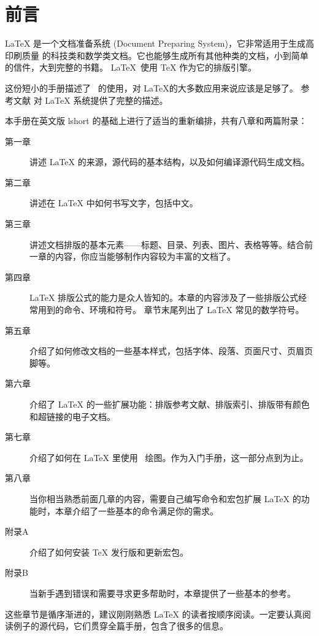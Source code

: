 \chapter{前言}

\LaTeX{} \cite{manual} 是一个文档准备系统 (Document Preparing System)，它非常适用于生成高印刷质量
的科技类和数学类文档。它也能够生成所有其他种类的文档，小到简单的信件，大到完整的书籍。
\LaTeX~使用 \TeX{} \cite{texbook} 作为它的排版引擎。

这份短小的手册描述了 \LaTeXe\ 的使用，对 \LaTeX 的大多数应用来说应该是足够了。
参考文献 \cite{manual,companion} 对 \LaTeX{} 系统提供了完整的描述。

\bigskip
本手册在英文版 lshort 的基础上进行了适当的重新编排，共有八章和两篇附录：
\begin{description}
  \item[第一章] 讲述 \LaTeX{} 的来源，源代码的基本结构，以及如何编译源代码生成文档。
  \item[第二章] 讲述在 \LaTeX{} 中如何书写文字，包括中文。
  \item[第三章] 讲述文档排版的基本元素——标题、目录、列表、图片、表格等等。结合前一章的内容，你应当能够制作内容较为丰富的文档了。
  \item[第四章] \LaTeX{} 排版公式的能力是众人皆知的。本章的内容涉及了一些排版公式经常用到的命令、环境和符号。
                章节末尾列出了 \LaTeX{} 常见的数学符号。
  \item[第五章] 介绍了如何修改文档的一些基本样式，包括字体、段落、页面尺寸、页眉页脚等。
  \item[第六章] 介绍了 \LaTeX{} 的一些扩展功能：排版参考文献、排版索引、排版带有颜色和超链接的电子文档。
  \item[第七章] 介绍了如何在 \LaTeX{} 里使用 \TikZ\ 绘图。作为入门手册，这一部分点到为止。
  \item[第八章] 当你相当熟悉前面几章的内容，需要自己编写命令和宏包扩展 \LaTeX{} 的功能时，本章介绍了一些基本的命令满足你的需求。
\end{description}
\begin{description}
  \item[附录A] 介绍了如何安装 \TeX{} 发行版和更新宏包。
  \item[附录B] 当新手遇到错误和需要寻求更多帮助时，本章提供了一些基本的参考。
\end{description}

\bigskip
这些章节是循序渐进的，建议刚刚熟悉 \LaTeX{} 的读者按顺序阅读。一定要认真阅读例子的源代码，它们贯穿全篇手册，包含了很多的信息。

